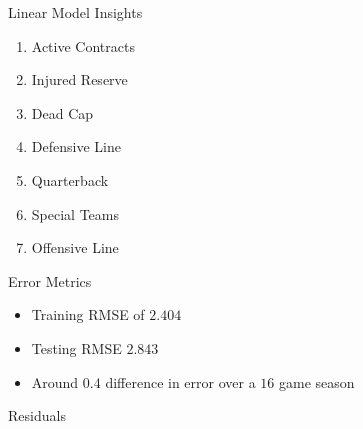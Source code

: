 \documentclass[11pt]{beamer}
\begin{document}
\begin{frame}{Linear Model Insights}

\begin{enumerate}

\item Active Contracts

\item Injured Reserve

\item Dead Cap

\item Defensive Line

\item Quarterback

\item Special Teams

\item Offensive Line

\end{enumerate}

\end{frame}

\begin{frame}{Error Metrics}

\begin{itemize}

\item Training RMSE of $2.404$

\item Testing RMSE $2.843$

\item Around $0.4$ difference in error over a $16$ game season

\end{itemize}

\end{frame}

\begin{frame}{Residuals}

\begin{figure}



\end{figure}


\end{frame}
\end{document}

